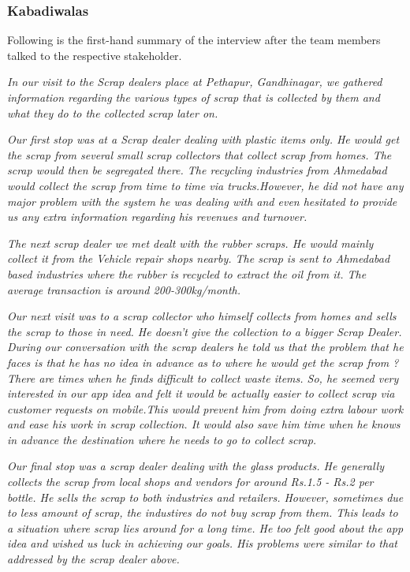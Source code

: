 \documentclass{article}
\begin{document}
\subsubsection{Kabadiwalas}
\par Following is the first-hand summary of the interview after the team members talked to the respective stakeholder.

\par \textit{ In our visit to the Scrap dealers place at Pethapur, Gandhinagar, we gathered information regarding the various types of scrap that is collected by them and what they do to the collected scrap later on.}

\par \textit{Our first stop was at a Scrap dealer dealing with plastic items only. He would get the scrap from several small scrap collectors that collect scrap from homes. The scrap would then be segregated there. The recycling industries from Ahmedabad would collect the scrap from time to time via trucks.However, he did not have any major problem with the system he was dealing with and even hesitated to provide us any extra information regarding his revenues and turnover.}

\par \textit{The next scrap dealer we met dealt with the rubber scraps. He would mainly collect it from the Vehicle repair shops nearby. The scrap is sent to Ahmedabad based industries where the rubber is recycled to extract the oil from it. The average transaction is around 200-300kg/month. } 
\par \textit{Our next visit was to a scrap collector who himself collects from homes and sells the scrap to those in need. He doesn't give the collection to a bigger Scrap Dealer. During our conversation with the scrap dealers he told us that the problem that he faces is that he has no idea in advance as to where he would get the scrap from ? There are times when he finds difficult to collect waste items. So, he seemed very interested in our app idea and felt it would be actually easier to collect scrap via customer requests on mobile.This would prevent him from doing extra labour work and ease his work in scrap collection. It would also save him time when he knows in advance the destination where he needs to go to collect scrap.}
\par \textit{Our final stop was a scrap dealer dealing with the glass products. He generally collects the scrap from local shops and vendors for around Rs.1.5 - Rs.2 per bottle. He sells the scrap to both industries and retailers. However, sometimes due to less amount of scrap, the industires do not buy scrap from them. This leads to a situation where scrap lies around for a long time. He too felt good about the app idea and wished us luck in achieving our goals. His problems were similar to that addressed by the scrap dealer above.}
\end{document}
